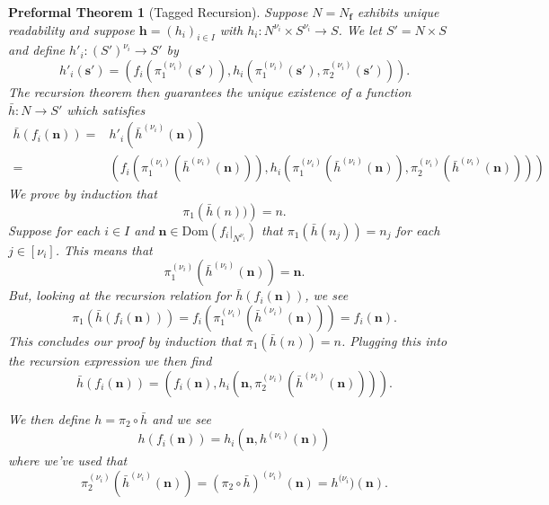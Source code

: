 \documentclass[oneside, 12pt]{book}
\theoremstyle{break}
\newtheorem{preformal definition}[definition]{Preformal Definition}
\newtheorem{preformal theorem}[theorem]{Preformal Theorem}
\newcommand{\bv}[1]{\boldsymbol{#1}}
\begin{document}
			\begin{preformal theorem}[Tagged Recursion]				
				Suppose $N = N_{\bv{f}}$ exhibits unique readability and suppose $\bv{h} = (h_i)_{i \in I}$ with $h_i: N^{\nu_i} \times S^{\nu_i} \to S$. 
				We let $S' = N \times S$ and define $h'_i: (S')^{\nu_i} \to S'$ by
				\begin{equation*}
					h'_i(\bv{s}') = \left(f_i\left(\pi_1^{(\nu_i)}(\bv{s}')\right), h_i\left(\pi_1^{(\nu_i)}(\bv{s}'), \pi_2^{(\nu_i)}(\bv{s}')\right)\right).
				\end{equation*}
				The recursion theorem then guarantees the unique existence of a function $\bar{h}: N \to S'$ which satisfies
				\begin{align*}
					\bar{h}(f_i(\bv{n})) =& h'_i\left(\bar{h}^{(\nu_i)}(\bv{n})\right)\\
					=& \left(f_i\left(\pi_1^{(\nu_i)}\left(\bar{h}^{(\nu_i)}(\bv{n})\right)\right), h_i\left(\pi_1^{(\nu_i)}\left(\bar{h}^{(\nu_i)}(\bv{n})\right), \pi_2^{(\nu_i)}\left(\bar{h}^{(\nu_i)}(\bv{n})\right) \right) \right)
				\end{align*}		
				We prove by induction that
				\begin{equation*}
					\pi_1\left(\bar{h}(n))\right) = n.
				\end{equation*}
				Suppose for each $i\in I$ and $\bv{n} \in \text{Dom}(f_i|_{N^{\nu_i}})$ that $\pi_1\left(\bar{h}(n_j)\right) = n_j$ for each $j\in [\nu_i]$.
				This means that 
				\begin{equation*}
					\pi_1^{(\nu_i)}\left(\bar{h}^{(\nu_i)}(\bv{n})\right) = \bv{n}.
				\end{equation*}
				But, looking at the recursion relation for $\bar{h}(f_i(\bv{n}))$, we see
				\begin{equation*}
					\pi_1\left(\bar{h}(f_i(\bv{n}))\right) = f_i\left(\pi_1^{(\nu_i)}(\bar{h}^{(\nu_i)}(\bv{n}))\right) = f_i(\bv{n}).
				\end{equation*}
				This concludes our proof by induction that $\pi_1\left(\bar{h}(n)\right) = n$.
				Plugging this into the recursion expression we then find
				\begin{equation*}
					\bar{h}(f_i(\bv{n})) = \left(f_i(\bv{n}), h_i\left(\bv{n}, \pi_2^{(\nu_i)}\left(\bar{h}^{(\nu_i)}(\bv{n})\right)\right)\right).
				\end{equation*}
				
				We then define $h = \pi_2 \circ \bar{h}$ and we see
				\begin{equation*}
					h(f_i(\bv{n})) = h_i(\bv{n}, h^{(\nu_i)}(\bv{n}))
				\end{equation*}
				where we've used that 
				\begin{equation*}
					\pi_2^{(\nu_i)}(\bar{h}^{(\nu_i)}(\bv{n})) = (\pi_2 \circ \bar{h})^{(\nu_i)}(\bv{n}) = h^{(\nu_i})(\bv{n}).
				\end{equation*}
			\end{preformal theorem}
			
\end{document}
